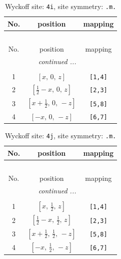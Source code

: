 \documentclass[fleqn,8pt]{jsarticle}
\begin{document}
\renewcommand{\arraystretch}{1.2}
\begin{longtable}{ccc}
\caption{Wyckoff site: {\tt 4i}, site symmetry: {\tt .m.}}
 \\
 \hline \hline
No. & position & mapping \\ \hline \endfirsthead

\multicolumn{2}{l}{\tablename\ \thetable{}} \\
 \hline \hline
No. & position & mapping \\ \hline \endhead

 \hline \hline
\multicolumn{2}{r}{\footnotesize\it continued ...} \\ \endfoot

 \hline \hline
\multicolumn{2}{r}{} \\ \endlastfoot

1 & $\left[ x,\, 0,\, z \right]$ & {\tt [1,4]} \\ \hline
2 & $\left[ \frac{1}{2} - x,\, 0,\, z \right]$ & {\tt [2,3]} \\ \hline
3 & $\left[ x + \frac{1}{2},\, 0,\, - z \right]$ & {\tt [5,8]} \\ \hline
4 & $\left[ - x,\, 0,\, - z \right]$ & {\tt [6,7]} \\
\end{longtable}
\renewcommand{\arraystretch}{1.2}
\begin{longtable}{ccc}
\caption{Wyckoff site: {\tt 4j}, site symmetry: {\tt .m.}}
 \\
 \hline \hline
No. & position & mapping \\ \hline \endfirsthead

\multicolumn{2}{l}{\tablename\ \thetable{}} \\
 \hline \hline
No. & position & mapping \\ \hline \endhead

 \hline \hline
\multicolumn{2}{r}{\footnotesize\it continued ...} \\ \endfoot

 \hline \hline
\multicolumn{2}{r}{} \\ \endlastfoot

1 & $\left[ x,\, \frac{1}{2},\, z \right]$ & {\tt [1,4]} \\ \hline
2 & $\left[ \frac{1}{2} - x,\, \frac{1}{2},\, z \right]$ & {\tt [2,3]} \\ \hline
3 & $\left[ x + \frac{1}{2},\, \frac{1}{2},\, - z \right]$ & {\tt [5,8]} \\ \hline
4 & $\left[ - x,\, \frac{1}{2},\, - z \right]$ & {\tt [6,7]} \\
\end{longtable}
\end{document}
